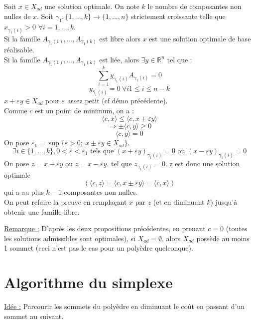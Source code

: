 
\begin{dem}
Soit $x\in X_{ad}$ une solution optimale. On note $k$ le nombre de composantes non nulles de $x$. Soit $\gamma_1:\{1,...,k\}\to \{1,...,n\}$ strictement croissante telle que $x_{\gamma_1(i)}>0$ $\forall i=1,...,k$.\\
Si la famille $A_{\gamma_1(1)},...,A_{\gamma_1(k)}$ est libre alors $x$ est une solution optimale de base réalisable.\\
Si la famille $A_{\gamma_1(1)},...,A_{\gamma_1(k)}$ est liée, alors $\exists y\in\mathbb{R}^n$ tel que :
	\[\sum_{i=1}^k y_{\gamma_1(i)} A_{\gamma_1(i)}=0\]
	\[y_{\hat{\gamma}_1(i)}=0\ \forall i 1\leq i\leq n-k\]
$x+\varepsilon y\in X_{ad}$ pour $\varepsilon$ assez petit (cf démo précédente). \\
Comme $c$ est un point de minimum, on a :
	\[\langle c,x\rangle \leq \langle c, x\pm \varepsilon y\rangle\]
	\[\Rightarrow \pm\langle c, y\rangle \geq 0\]
	\[\langle c,y\rangle=0\]
On pose $\varepsilon_1=\sup\{\varepsilon>0;\ x\pm\varepsilon y\in X_{ad}\}$. 
	\[\exists i\in \{1,...,k\}, 0<\varepsilon<\varepsilon_1 \text{ tels que } (x+\varepsilon y)_{\gamma_1(i)}=0 \text{ ou } (x-\varepsilon y)_{\gamma_1(i)}=0\]
On pose $z=x+\varepsilon y$ ou $z=x-\varepsilon y$. tel que $z_{\gamma_1(i)}=0$. z est donc une solution optimale 
\[(\langle c,z\rangle=\langle c,x\pm\varepsilon y\rangle = \langle c,x\rangle)\]
qui a au plus $k-1$ composantes non nulles.\\
On peut refaire la preuve en remplaçant $x$ par $z$ (et en diminuant $k$) jusqu'à obtenir une famille libre.
\end{dem}

\underline{Remarque :} D'après les deux propositions précédentes, en prenant $c=0$ (toutes les solutions admissibles sont optimales), si $X_{ad}=\emptyset$, alors $X_{ad}$ possède au moins 1 sommet (ceci n'est pas le cas pour un polyèdre quelconque).

\section{Algorithme du simplexe}
\underline{Idée :} Parcourir les sommets du polyèdre en diminuant le coût en passant d'un sommet au suivant.


